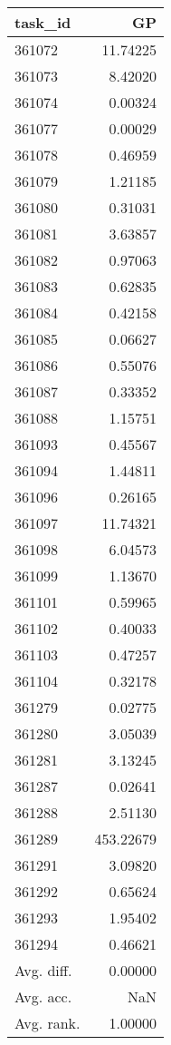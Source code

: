 \begin{tabular}{lr}
\toprule
task\_id & GP \\
\midrule
361072 & 11.74225 \\
361073 & 8.42020 \\
361074 & 0.00324 \\
361077 & 0.00029 \\
361078 & 0.46959 \\
361079 & 1.21185 \\
361080 & 0.31031 \\
361081 & 3.63857 \\
361082 & 0.97063 \\
361083 & 0.62835 \\
361084 & 0.42158 \\
361085 & 0.06627 \\
361086 & 0.55076 \\
361087 & 0.33352 \\
361088 & 1.15751 \\
361093 & 0.45567 \\
361094 & 1.44811 \\
361096 & 0.26165 \\
361097 & 11.74321 \\
361098 & 6.04573 \\
361099 & 1.13670 \\
361101 & 0.59965 \\
361102 & 0.40033 \\
361103 & 0.47257 \\
361104 & 0.32178 \\
361279 & 0.02775 \\
361280 & 3.05039 \\
361281 & 3.13245 \\
361287 & 0.02641 \\
361288 & 2.51130 \\
361289 & 453.22679 \\
361291 & 3.09820 \\
361292 & 0.65624 \\
361293 & 1.95402 \\
361294 & 0.46621 \\
Avg. diff. & 0.00000 \\
Avg. acc. & NaN \\
Avg. rank. & 1.00000 \\
\bottomrule
\end{tabular}
